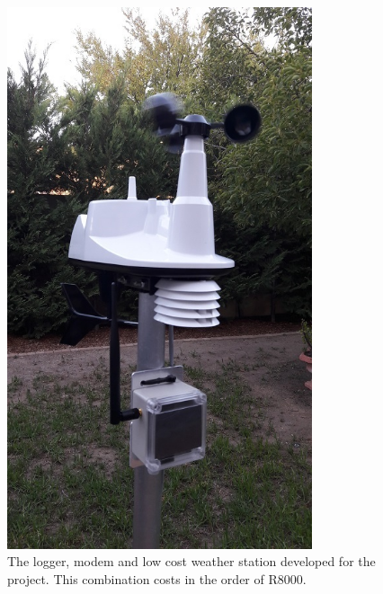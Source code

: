 \documentclass{wrcreport}
\begin{document}
\begin{figure}[!htp]
  \begin{center}
    \includegraphics[width=0.8\textwidth]{WeatherStation_1.jpg}
  \end{center}
  \caption[The logger, modem and low cost weather station developed for the project.]{The logger, modem and low cost weather station developed for the project. This combination costs in the order of R8000.}
\label{fig:logger2}
\end{figure}
\end{document}
